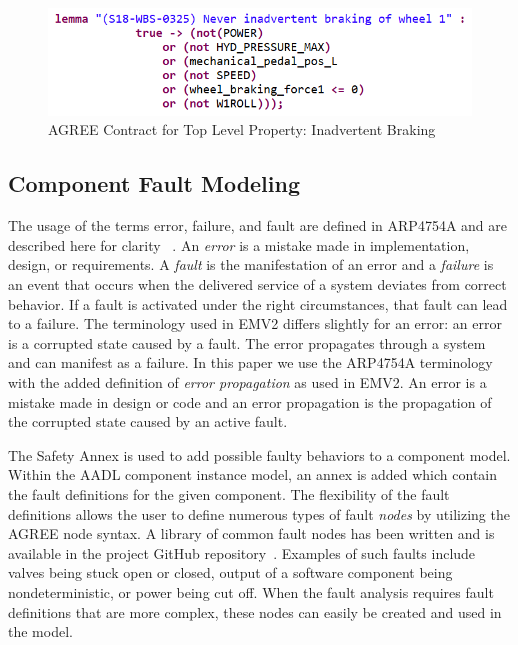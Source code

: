 \begin{figure}[h!]
	\begin{center}
	\includegraphics[width=.9\columnwidth]{images/inadvertent_braking.png}
	\end{center}
	\caption{AGREE Contract for Top Level Property: Inadvertent Braking}
	\label{fig:inadvertent_braking}
	\vspace{-0.2in}
\end{figure}


\subsection{Component Fault Modeling}

The usage of the terms error, failure, and fault are defined in ARP4754A and are described here for clarity
~\cite{SAE:ARP4754A}. An \textit{error} is a mistake made in implementation, design, or requirements. A \textit{fault} is the manifestation of an error and a \textit{failure} is an event that occurs when the delivered service of a system deviates from correct behavior. If a fault is activated under the right circumstances, that fault can lead to a failure. The terminology used in EMV2 differs slightly for an error: an error is a corrupted state caused by a fault. The error propagates through a system and can  manifest as a failure. In this paper we use the ARP4754A terminology with the added definition of \textit{error propagation} as used in EMV2. An error is a mistake made in design or code and an error propagation is the propagation of the corrupted state caused by an active fault. 

The Safety Annex is used to add possible faulty behaviors to a component model. Within the AADL component instance model, an annex is added which contain the fault definitions for the given component. The flexibility of the fault definitions allows the user to define numerous types of fault \textit{nodes} by utilizing the AGREE node syntax. A library of common fault nodes has been written and is available in the project GitHub repository~\cite{SAGithub}. Examples of such faults include valves being stuck open or closed, output of a software component being nondeterministic, or power being cut off.  When the fault analysis requires fault definitions that are more complex, these nodes can easily be created and used in the model. 

